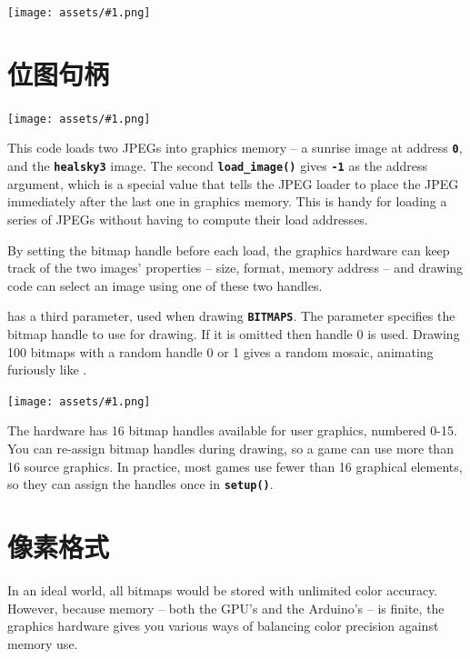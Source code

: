 \documentclass[10pt]{book}
\makeatletter
\newcommand{\png}[1]{
\begin{center}
\texttt{[image: assets/\#1.png]}
\end{center}
}
\newcommand{\mach}[1]{\texttt{\textbf{#1}}}
\newcommand{\cmdidx}[1]{
\index{#1@\mach{#1()}}
}
\newcommand{\dcmd}[1]{\cmdidx{#1}\nameref{#1}}
\makeatother
\begin{document}
\begin{CJK}{UTF8}{gkai}
\png{0009}
\clearpage

\section{位图句柄}
\label{bitmaphandles}

\png{jpeg2}


This code loads two JPEGs into graphics memory -- a sunrise image at address \mach{0}, and the \mach{healsky3} image.
The second \mach{load\_image()} gives \mach{-1} as the address argument, which is a special value that
tells the JPEG loader to place the JPEG immediately after the last one in graphics memory.
This is handy for loading a series of JPEGs without having to compute their load addresses.

By setting the bitmap handle before each load, the graphics hardware can keep track of the two images' properties -- size, format, memory address -- 
and drawing code can select an image using one of these two handles.

\dcmd{Vertex2ii} has a third parameter, used when drawing \mach{BITMAPS}.
The parameter specifies the bitmap handle to use for drawing.
If it is omitted then handle 0 is used.  
Drawing 100 bitmaps with a random handle 0 or 1
gives a random mosaic, animating furiously like .
\png{0010}

The hardware has 16 bitmap handles available for user graphics, numbered 0-15.
You can re-assign bitmap handles during drawing, so a game can use more than 16 source graphics.
In practice, most games use fewer than 16 graphical elements, so they can assign the handles once in \mach{setup()}.

\newpage
\section{像素格式}

In an ideal world, all bitmaps would be stored with unlimited color accuracy.
However, because memory -- both the GPU's and the Arduino's -- is finite,
the graphics hardware gives you various ways of balancing color precision against memory use.

\newcommand{\fmline}[3]{
\index{#1 bitmap format@\mach{#1} bitmap format}
\index{bitmap format!#1@\mach{#1}}
\textbf{\large\mach{#1}} &
#3
& {\raisebox{-96pt}{\texttt{[image: \#2]}}} \\
}


\end{CJK}
\end{document}
